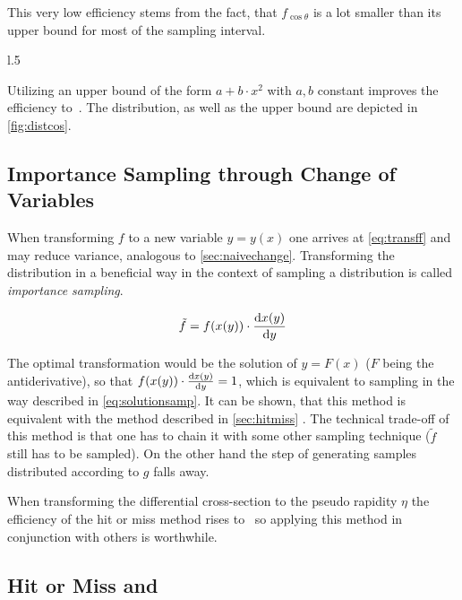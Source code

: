 This very low efficiency stems from the fact, that \(f_{\cos\theta}\)
is a lot smaller than its upper bound for most of the sampling
interval.

\begin{wrapfigure}[15]{l}{.5\textwidth}
  \caption{\label{fig:distcos} The distribution \cref{eq:distcos} and an upper bound of
    the form \(a + b\cdot x^2\).}
\end{wrapfigure}

Utilizing an upper bound of the form \(a + b\cdot x^2\) with \(a, b\)
constant improves the efficiency
to~. The distribution, as well as the
upper bound are depicted in \cref{fig:distcos}.

\subsection{Importance Sampling through Change of Variables}%
\label{sec:importsamp}

When transforming \(f\) to a new variable \(y=y(x)\) one arrives at
\cref{eq:transff} and may reduce variance, analogous to
\cref{sec:naivechange}. Transforming the distribution in a beneficial
way in the context of sampling a distribution is called
\emph{importance sampling}.

\begin{equation}
  \label{eq:transff}
  \tilde{f} = f(x(y)) \cdot \dv{x(y)}{y}
\end{equation}

The optimal transformation would be the solution of \(y = F(x)\)
(\(F\) being the antiderivative), so that
\(f(x(y)) \cdot \dv{x(y)}{y} = 1\), which is equivalent to sampling in
the way described in \cref{eq:solutionsamp}. It can be shown, that
this method is equivalent with the method described in
\cref{sec:hitmiss} \cite{Lepage:19781an}. The technical trade-off of
this method is that one has to chain it with some other sampling
technique (\(\tilde{f}\) still has to be sampled). On the other hand
the step of generating samples distributed according to \(g\) falls
away.

When transforming the differential cross-section to the pseudo
rapidity \(\eta\) the efficiency of the hit or miss method rises
to~ so applying this method in conjunction
with others is worthwhile.

\subsection{Hit or Miss and \vegas}%
\label{sec:stratsamp}

